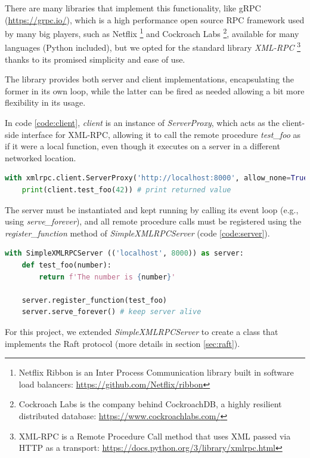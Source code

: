 There are many libraries that implement this functionality, like gRPC (\url{https://grpc.io/}), which is a high performance open source RPC framework used by many big players, such as Netflix \footnote{Netflix Ribbon is an Inter Process Communication library built in software load balancers: \url{https://github.com/Netflix/ribbon}} and Cockroach Labs \footnote{Cockroach Labs is the company behind CockroachDB, a highly resilient distributed database: \url{https://www.cockroachlabs.com/}}, available for many languages (Python included), but we opted for the standard library \textit{XML-RPC} \footnote{XML-RPC is a Remote Procedure Call method that uses XML passed via HTTP as a transport: \url{https://docs.python.org/3/library/xmlrpc.html}} thanks to its promised simplicity and ease of use. 

The library provides both server and client implementations, encapsulating the former in its own loop, while the latter can be fired as needed allowing a bit more flexibility in its usage.

In code \ref{code:client}, \textit{client} is an instance of \textit{ServerProxy}, which acts as the client-side interface for XML-RPC, \textcolor{changes}{allowing it to call} the remote procedure \textit{test\_foo} as if it were a local function, even though it executes on a server in a different networked location.

\begin{lstlisting}[language={Python},label={code:client}, caption={Client as server proxy}]
with xmlrpc.client.ServerProxy('http://localhost:8000', allow_none=True) as client:
    print(client.test_foo(42)) # print returned value
\end{lstlisting}

The server must be instantiated and kept running by calling its event loop (e.g., using \textit{serve\_forever}), and all remote procedure calls must be registered using the \textit{register\_function} method of \textit{SimpleXMLRPCServer} (code \ref{code:server}).

\begin{lstlisting}[language={Python},label={code:server}, caption={Server}]
with SimpleXMLRPCServer (('localhost', 8000)) as server:
    def test_foo(number):
        return f'The number is {number}'

    server.register_function(test_foo)  
    server.serve_forever() # keep server alive
\end{lstlisting}

For this project, we extended \textit{SimpleXMLRPCServer} to create a class that implements the Raft protocol \textcolor{changes}{(more details in section \ref{sec:raft}).}

